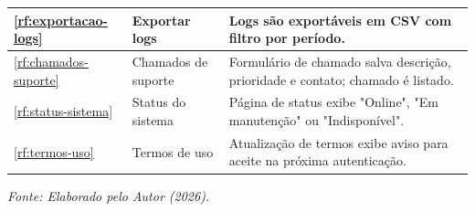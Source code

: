\begin{longtable}{p{1cm} p{3.2cm} p{10.8cm}}
\ref{rf:exportacao-logs} & Exportar logs & Logs são exportáveis em CSV com filtro por período. \\
\midrule
\ref{rf:chamados-suporte} & Chamados de suporte & Formulário de chamado salva descrição, prioridade e contato; chamado é listado. \\
\ref{rf:status-sistema} & Status do sistema & Página de status exibe "Online", "Em manutenção" ou "Indisponível". \\
\ref{rf:termos-uso} & Termos de uso & Atualização de termos exibe aviso para aceite na próxima autenticação. \\
\bottomrule
\end{longtable}
\noindent\raggedright\small\textit{Fonte: Elaborado pelo Autor (2026).}
\endgroup
\normalsize
\renewcommand{\arraystretch}{1.0}
